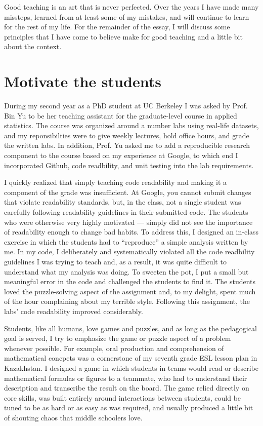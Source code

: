\documentclass{article}
\begin{document}
Good teaching is an art that is never perfected.  Over the years I have made
many missteps, learned from at least some of my mistakes, and will continue to
learn for the rest of my life.  For the remainder of the essay, I will discuss
some principles that I have come to believe make for good teaching and a
little bit about the context.


\section{Motivate the students}

During my second year as a PhD student at UC Berkeley I was asked by Prof. Bin
Yu to be her teaching assistant for the graduate-level course in applied
statistics.  The course was organized around a number labs using real-life
datasets, and my reponsibilties were to give weekly lectures, hold office hours,
and grade the written labs.  In addition, Prof. Yu asked me to add a
reproducible research component to the course based on my experience at Google,
to which end I incorporated Github, code readbility, and unit testing into
the lab requirements.

I quickly realized that simply teaching code readability and making it a
component of the grade was insufficient.  At Google, you cannot submit changes
that violate readability standards, but, in the class, not a single student was
carefully following readability guidelines in their submitted code.  The
students --- who were otherwise very highly motivated --- simply did not see the
importance of readability enough to change bad habits.  To address this, I
designed an in-class exercise in which the students had to ``reproduce'' a
simple analysis written by me.  In my code, I deliberately and systematically
violated all the code readbility guidelines I was trying to teach and, as a
result, it was quite difficult to understand what my analysis was doing.  To
sweeten the pot, I put a small but meaningful error in the code and challenged
the students to find it.  The students loved the puzzle-solving aspect of the
assignment and, to my delight, spent much of the hour complaining about my
terrible style.  Following this assignment, the labs' code readability improved
considerably.

Students, like all humans, love games and puzzles, and as long as the
pedagogical goal is served, I try to emphasize the game or puzzle aspect of a
problem whenever possible.  For example, oral production and comprehension of
mathematical concpets was a cornerstone of my seventh grade ESL lesson plan in
Kazakhstan.  I designed a game in which students in teams would read or describe
mathematical formulas or figures to a teammate, who had to understand their
description and transcribe the result on the board.  The game relied directly on
core skills, was built entirely around interactions between students, could be
tuned to be as hard or as easy as was required, and usually produced a little
bit of shouting chaos that middle schoolers love.
\end{document}
